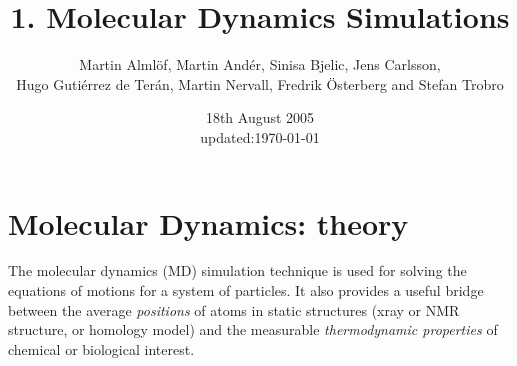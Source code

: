 \documentclass[a4paper,12pt]{article}
\title{1. Molecular Dynamics Simulations}
\author{Martin Alml\"{o}f, Martin And\'er, Sinisa Bjelic, Jens Carlsson, \\ Hugo Guti\'errez de Ter\'an, Martin Nervall, Fredrik \"{O}sterberg and Stefan Trobro}
\date{18th August 2005 \\ \footnotesize{updated:\today}}
\begin{document}
\maketitle
\tableofcontents
\newpage

\section{Molecular Dynamics: theory}
The molecular dynamics  (MD) simulation technique is  used for solving
the equations of motions for a system of particles. It also provides a
useful bridge between  the average {\it positions} of  atoms in static
structures  (xray  or  NMR  structure,  or  homology  model)  and  the
measurable {\it  thermodynamic properties}  of chemical  or biological
interest.\\
\end{document}
